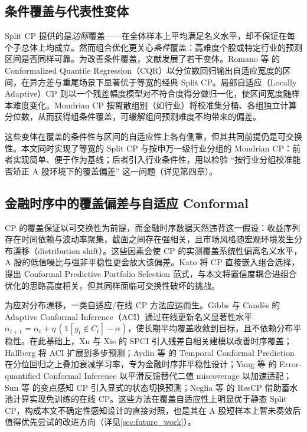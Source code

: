 \subsection{条件覆盖与代表性变体}
Split CP 提供的是\emph{边际}覆盖——在全体样本上平均满足名义水平，却不保证在每个子总体上均成立。然而组合优化更关心\emph{条件}覆盖：高难度个股或特定行业的预测区间是否同样可靠。为改善条件覆盖，文献发展了若干变体。Romano 等\cite{Romano2019CQR} 的 Conformalized Quantile Regression（CQR）以分位数回归输出自适应宽度的区间，在异方差与重尾场景下显著优于等宽的经典 Split CP。局部自适应（Locally Adaptive）CP 则以一个残差幅度模型对不符合度得分做归一化，使区间宽度随样本难度变化。Mondrian CP 按离散组别（如行业）将校准集分桶、各组独立计算分位数，从而获得组条件覆盖，可缓解组间预测难度不均带来的偏差。

这些变体在覆盖的条件性与区间的自适应性上各有侧重，但其共同前提仍是可交换性。本文同时实现了等宽的 Split CP 与按申万一级行业分组的 Mondrian CP：前者实现简单、便于作为基线；后者引入行业条件性，用以检验 ``按行业分组校准能否矫正 A 股环境下的覆盖偏差'' 这一问题（详见第四章）。

\subsection{金融时序中的覆盖偏差与自适应 Conformal}
CP 的覆盖保证以可交换性为前提，而金融时序数据天然违背这一假设：收益序列存在时间依赖与波动率聚集，截面之间存在强相关，且市场风格随宏观环境发生分布漂移（distribution shift）。这些因素会使 CP 的实测覆盖系统性偏离名义水平，A 股的低信噪比与强非平稳性更会放大该偏差。Kato\cite{Kato2024CPPS} 将 CP 直接嵌入组合选择，提出 Conformal Predictive Portfolio Selection 范式，与本文将置信度耦合进组合优化的思路高度相关，但其同样面临可交换性破坏的挑战。

为应对分布漂移，一类自适应/在线 CP 方法应运而生。Gibbs 与 Cand\`es\cite{Gibbs2021ACI} 的 Adaptive Conformal Inference（ACI）通过在线更新名义显著性水平 $\alpha_{t+1}=\alpha_t+\eta\,(\mathbb{1}[y_t\notin C_t]-\alpha)$，使长期平均覆盖收敛到目标，且不依赖分布平稳性。在此基础上，Xu 与 Xie\cite{Xu2023SPCI} 的 SPCI 引入残差自相关建模以改善时序覆盖；Hallberg\cite{Hallberg2024MultiStepACI} 将 ACI 扩展到多步预测；Aydin 等\cite{Aydin2025TCP} 的 Temporal Conformal Prediction 在分位回归之上叠加衰减学习率，专为金融时序非平稳性设计；Yang 等\cite{Yang2025ECI} 的 Error-quantified Conformal Inference 以平滑反馈替代二值 miscoverage 以加速适配；Sun 等\cite{Sun2025CPTC} 的变点感知 CP 引入显式的状态切换预测；Neglia 等\cite{Neglia2026ResCP} 的 ResCP 借助蓄水池计算实现免训练的在线 CP。这些方法在覆盖自适应性上明显优于静态 Split CP，构成本文不确定性感知设计的直接对照，也是其在 A 股短样本上暂未奏效后值得优先尝试的改进方向（详见\ref{sec:future_work}）。

